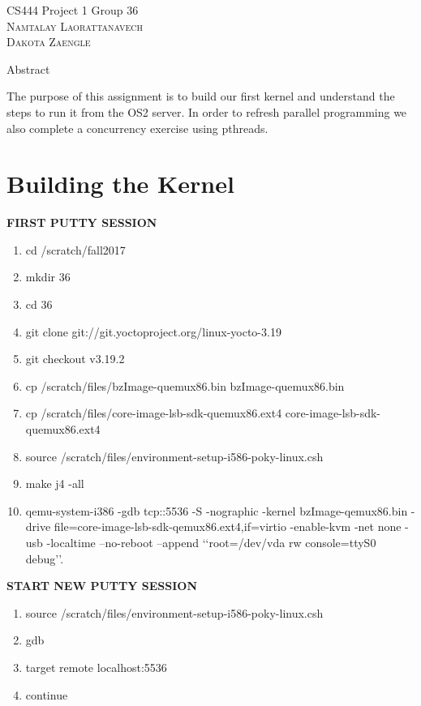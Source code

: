 \documentclass[letterpaper,10pt]{article}
\begin{document}
\begin{titlepage}
   \centering
   \vspace*{\baselineskip}
   {\LARGE CS444 Project 1 Group 36}
   \vspace{2\baselineskip}
   {\scshape\Large \\ Namtalay Laorattanavech \\ Dakota Zaengle \\}
   \vspace{2\baselineskip}
   
   Abstract
   
   \vspace{0.5\baselineskip}
   The purpose of this assignment is to build our first kernel and understand the steps to run it from the OS2 server. In order to refresh parallel programming we also complete a concurrency exercise using pthreads.
\end{titlepage}

\section*{Building the Kernel}

\textbf{FIRST PUTTY SESSION}

\begin{enumerate}
\item cd /scratch/fall2017
\item mkdir 36
\item cd 36
\item git clone git://git.yoctoproject.org/linux-yocto-3.19
\item git checkout v3.19.2
\item cp /scratch/files/bzImage-quemux86.bin bzImage-quemux86.bin
\item cp /scratch/files/core-image-lsb-sdk-quemux86.ext4 core-image-lsb-sdk-quemux86.ext4
\item source /scratch/files/environment-setup-i586-poky-linux.csh
\item make j4 -all
\item qemu-system-i386 -gdb tcp::5536 -S -nographic -kernel bzImage-qemux86.bin -drive
file=core-image-lsb-sdk-qemux86.ext4,if=virtio -enable-kvm -net none -usb -localtime
--no-reboot --append ‘‘root=/dev/vda rw console=ttyS0 debug’’.
\end{enumerate}

\textbf{START NEW PUTTY SESSION}
\begin{enumerate}
\item source /scratch/files/environment-setup-i586-poky-linux.csh
\item gdb
\item target remote localhost:5536
\item continue
\end{enumerate}
\end{document}
